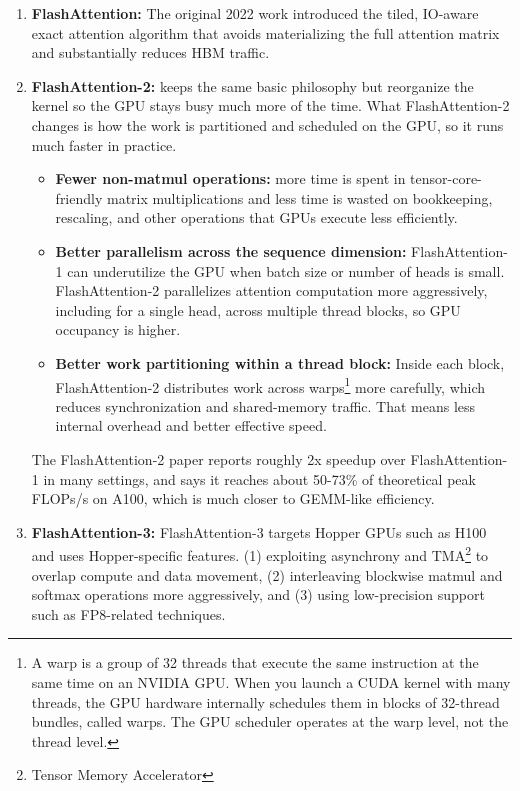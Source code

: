 \documentclass[11pt]{article}  %
\begin{document}
\begin{enumerate}
  \item \textbf{FlashAttention:} The original 2022 work introduced the tiled, IO-aware exact attention algorithm that avoids materializing the full attention matrix and substantially reduces HBM traffic.
  
  \item \textbf{FlashAttention-2:} keeps the same basic philosophy but reorganize the kernel so the GPU stays busy much more of the time. 
  What FlashAttention-2 changes is how the work is partitioned and scheduled on the GPU, so it runs much faster in practice.
  \begin{itemize}
    \item \textbf{Fewer non-matmul operations:} more time is spent in tensor-core-friendly matrix multiplications and less time is wasted on bookkeeping, rescaling, and other operations that GPUs execute less efficiently.
    
    \item \textbf{Better parallelism across the sequence dimension:} FlashAttention-1 can underutilize the GPU when batch size or number of heads is small. FlashAttention-2 parallelizes attention computation more aggressively, including for a single head, across multiple thread blocks, so GPU occupancy is higher.
    
    \item \textbf{Better work partitioning within a thread block:} Inside each block, FlashAttention-2 distributes work across warps\footnote{A warp is a group of 32 threads that execute the same instruction at the same time on an NVIDIA GPU. When you launch a CUDA kernel with many threads, the GPU hardware internally schedules them in blocks of 32-thread bundles, called warps. The GPU scheduler operates at the warp level, not the thread level.} more carefully, which reduces synchronization and shared-memory traffic. That means less internal overhead and better effective speed.
  \end{itemize}
  The FlashAttention-2 paper reports roughly 2x speedup over FlashAttention-1 in many settings, and says it reaches about 50-73\% of theoretical peak FLOPs/s on A100, which is much closer to GEMM-like efficiency.
  
  \item \textbf{FlashAttention-3:} FlashAttention-3 targets Hopper GPUs such as H100 and uses Hopper-specific features. 
  (1) exploiting asynchrony and TMA\footnote{Tensor Memory Accelerator} to overlap compute and data movement, 
  (2) interleaving blockwise matmul and softmax operations more aggressively, and 
  (3) using low-precision support such as FP8-related techniques.
\end{enumerate}
\end{document}
